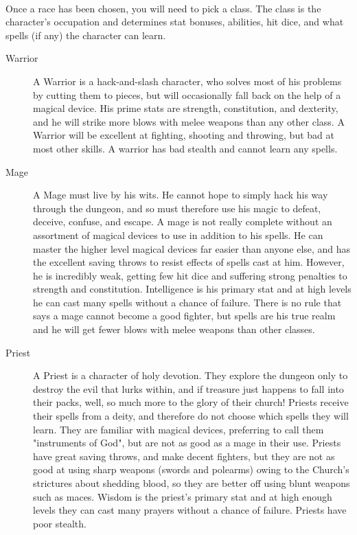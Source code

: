 \paragraph{}Once a race has been chosen, you will need to pick a class. The class
is the character's occupation and determines stat bonuses, abilities,
hit dice, and what spells (if any) the character can learn.
\begin{description}
\item[Warrior] A Warrior is a hack-and-slash character, who solves most of
     his problems by cutting them to pieces, but will occasionally
     fall back on the help of a magical device. His prime stats
     are strength, constitution, and dexterity, and he will strike
     more blows with melee weapons than any other class. A Warrior
     will be excellent at fighting, shooting and throwing, but bad
     at most other skills. A warrior has bad stealth and cannot
     learn any spells.

 \item[Mage] A Mage must live by his wits. He cannot hope to simply hack
     his way through the dungeon, and so must therefore use his
     magic to defeat, deceive, confuse, and escape. A mage is
     not really complete without an assortment of magical devices
     to use in addition to his spells. He can master the higher
     level magical devices far easier than anyone else, and has
     the excellent saving throws to resist effects of spells cast at
     him. However, he is incredibly weak, getting few hit dice
     and suffering strong penalties to strength and constitution.
     Intelligence is his primary stat and at high levels he can
     cast many spells without a chance of failure. There is no
     rule that says a mage cannot become a good fighter, but
     spells are his true realm and he will get fewer blows with
     melee weapons than other classes.

 \item[Priest] A Priest is a character of holy devotion. They explore the
     dungeon only to destroy the evil that lurks within, and if
     treasure just happens to fall into their packs, well, so
     much more to the glory of their church! Priests receive
     their spells from a deity, and therefore do not choose which
     spells they will learn. They are familiar with magical
     devices, preferring to call them "instruments of God", but
     are not as good as a mage in their use. Priests have great
     saving throws, and make decent fighters, but they are not
     as good at using sharp weapons (swords and polearms) owing to
     the Church's strictures about shedding blood, so they are
     better off using blunt weapons such as maces. Wisdom is the
     priest's primary stat and at high enough levels they can cast
     many prayers without a chance of failure. Priests have poor
     stealth.


\end{description}
